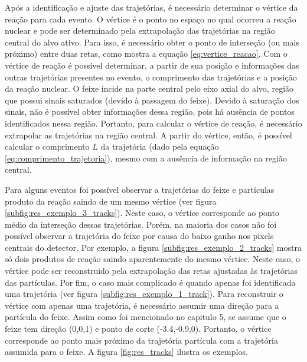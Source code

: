 \documentclass[a4paper,12pt,oneside]{book}
\begin{document}
\par Após a identificação e ajuste das trajetórias, é necessário determinar o vértice da reação para cada evento. O vértice é o ponto no espaço no qual ocorreu a reação nuclear e pode ser determinado pela extrapolação das trajetórias na região central do alvo ativo. Para isso, é necessário obter o ponto de interseção (ou mais próximo) entre duas retas, como mostra a  equação \ref{eq:vertice_reacao}. Com o vértice de reação é possível determinar, a partir de sua posição e informações das outras trajetórias presentes no evento, o comprimento das trajetórias e a posição da reação nuclear. O feixe incide na parte central pelo eixo axial do alvo, região que possui sinais saturados (devido à passagem do feixe). Devido à saturação dos sinais, não é possível obter informações dessa região, pois há ausência de pontos identificados nessa região. Portanto, para calcular o vértice de reação, é necessário extrapolar as trajetórias na região central. A partir do vértice, então, é possível calcular o comprimento $L$ da trajetória (dado pela equação \ref{eq:comprimento_trajetoria}), mesmo com a ausência de informação na região central.

\par Para alguns eventos foi possível observar a trajetórias do feixe e partículas produto da reação saindo de um mesmo vértice (ver figura \ref{subfig:res_exemplo_3_tracks}). Neste caso, o vértice corresponde ao ponto médio da interseção dessas trajetórias. Porém, na maioria dos casos não foi possível observar a trajetória do feixe por causa do baixo ganho nos pixels centrais do detector. Por exemplo, a figura \ref{subfig:res_exemplo_2_tracks} mostra só dois produtos de reação saindo aparentemente do mesmo vértice. Neste caso, o vértice pode ser reconstruido pela extrapolação das retas ajustadas às trajetórias das partículas. Por fim, o caso mais complicado é quando apenas foi identificada uma trajetória (ver figura \ref{subfig:res_exemplo_1_track}). Para reconstruir o vértice com apenas uma trajetória, é necessário assumir uma direção para a partícula do feixe. Assim como foi mencionado no capitulo 5, se assume que o feixe tem direção (0,0,1) e ponto de corte (-3.4,-0.9,0). Portanto, o vértice corresponde ao ponto mais próximo da trajetória partícula com a trajetória assumida para o feixe. A figura \ref{fig:res_tracks} ilustra os exemplos.
\end{document}
